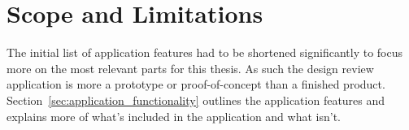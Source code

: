 



\section{Scope and Limitations}
The initial list of application features had to be shortened significantly to focus more on the most relevant parts for this thesis. As such the design review application
is more a prototype or proof-of-concept than a finished product. 
Section~\vref{sec:application_functionality} outlines the application features and explains more of what's included in the application and what isn't. 

